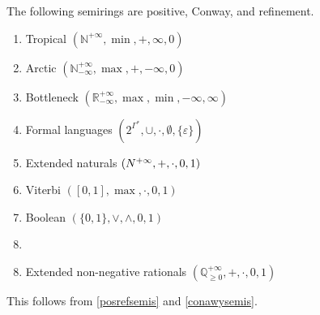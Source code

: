 \documentclass[a4paper,UKenglish,cleveref, autoref, thm-restate]{lipics-v2021}
\newcommand{\exN}{\mathbb{N}^{+\infty}}
\newcommand{\exQp}{\mathbb{Q}_{\geq0}^{+\infty}}
\theoremstyle{plain}\newtheoremrep{thm}{Theorem}[section]
\begin{document}
	\begin{correp}
		The following semirings are positive, Conway, and refinement.
		\begin{multicols}{2}
			\begin{enumerate}[nosep]
				\item Tropical $(\exN, \min, +, \infty, 0)$
				\item Arctic  $(\mathbb N^{+\infty}_{-\infty}, \max, +, -\infty, 0)$
				\item Bottleneck  $(\mathbb R^{+\infty}_{-\infty}, \max, \min, -\infty, \infty)$
				\item Formal languages  $(2^{\Gamma^*}, \cup, \cdot, \emptyset, \{\varepsilon\})$
				\item Extended naturals  $(\mathbb \exN, +, \cdot, 0, 1)$
				\item Viterbi  $([0,1], \max, \cdot, 0, 1)$
				\item Boolean  $(\{0,1\}, \lor, \land, 0, 1)$
				\item[]
			\end{enumerate}
		\end{multicols}
		\begin{enumerate}[nosep]
			\setcounter{enumi}{7}
				\item Extended non-negative rationals $(\exQp, +, \cdot, 0, 1)$
		\end{enumerate}
	\end{correp}
	\begin{appendixproof}
		This follows from \cref{posrefsemis} and \cref{conawysemis}.
	\end{appendixproof}
	
\end{document}
